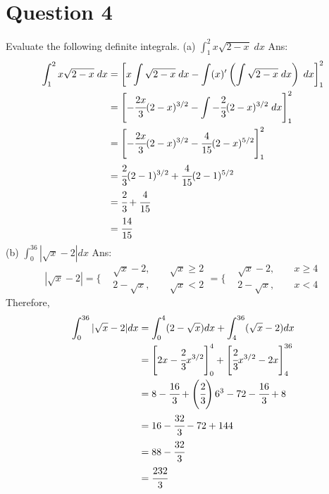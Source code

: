 \documentclass{article}
\begin{document}
\section*{Question 4}
Evaluate the following definite integrals. 
\newline
\newline
(a) $\displaystyle\int_{1}^{2} x \sqrt{2-x} \; dx$
\newline
\newline
Ans:
\begin{align*}
    \displaystyle\int_{1}^{2} x \sqrt{2-x} \; dx
    &= \left[  x\displaystyle\int\sqrt{2-x} \; dx - \displaystyle\int (x)' \left(\displaystyle\int \sqrt{2-x} \; dx\right) \; dx  \right]^2_1 \\
    &= \left[  -\cfrac{2x}{3}(2-x)^{3/2} - \displaystyle\int -\cfrac{2}{3}(2-x)^{3/2} \; dx  \right]^2_1 \\
    &= \left[  -\cfrac{2x}{3}(2-x)^{3/2} - \cfrac{4}{15}(2-x)^{5/2}  \right]^2_1 \\
    &= \cfrac{2}{3}(2-1)^{3/2} + \cfrac{4}{15}(2-1)^{5/2}  \\
    &= \cfrac{2}{3} + \cfrac{4}{15}  \\
    & = \cfrac{14}{15}
\end{align*}
\newline
\newline
(b) $\displaystyle\int_{0}^{36} |\sqrt{x}-2| dx$
\newline
\newline
Ans:
$$
|\sqrt{x}-2| = \Bigg\{ 
\begin{array}{cc}
     & \sqrt{x}-2, \;\;\;\;\;\;\; \sqrt{x} \geq 2 \\
     &  2-\sqrt{x}, \;\;\;\;\;\;\; \sqrt{x} < 2
\end{array}
= \Bigg\{ 
\begin{array}{cc}
     & \sqrt{x}-2, \;\;\;\;\;\;\; x \geq 4 \\
     &  2-\sqrt{x}, \;\;\;\;\;\;\; x < 4
\end{array}
$$
Therefore,
\begin{align*}
    \displaystyle\int_{0}^{36} |\sqrt{x}-2| dx
    & = \displaystyle\int_{0}^{4} (2-\sqrt{x}) dx + \displaystyle\int_{4}^{36} (\sqrt{x}-2) dx \\
    & = \left[  2x - \cfrac{2}{3} x^{3/2}   \right]_0^4 + \left[  \cfrac{2}{3} x^{3/2} - 2x   \right]_4^{36} \\
    & =  8 - \cfrac{16}{3} +  \left(\cfrac{2}{3}\right) 6^3 - 72 - \cfrac{16}{3} + 8 \\
    & = 16 - \cfrac{32}{3} - 72 + 144 \\
    & = 88 - \cfrac{32}{3} \\
    & = \cfrac{232}{3}
\end{align*}
\end{document}
